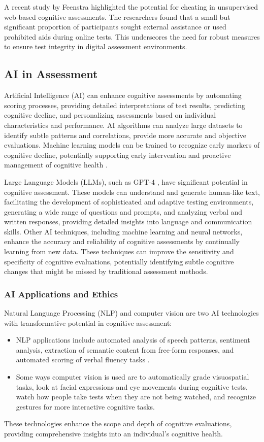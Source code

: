A recent study by Feenstra \cite{Feenstra2017} highlighted the potential for cheating in unsupervised web-based cognitive assessments. The researchers found that a small but significant proportion of participants sought external assistance or used prohibited aids during online tests. This underscores the need for robust measures to ensure test integrity in digital assessment environments.

\subsection{AI in Assessment}
Artificial Intelligence (AI) can enhance cognitive assessments by automating scoring processes, providing detailed interpretations of test results, predicting cognitive decline, and personalizing assessments based on individual characteristics and performance. AI algorithms can analyze large datasets to identify subtle patterns and correlations, provide more accurate and objective evaluations. Machine learning models can be trained to recognize early markers of cognitive decline, potentially supporting early intervention and proactive management of cognitive health \cite{Rabinowitz2019}.

Large Language Models (LLMs), such as GPT-4 \cite{Openai2023gpt4}, have significant potential in cognitive assessment. These models can understand and generate human-like text, facilitating the development of sophisticated and adaptive testing environments, generating a wide range of questions and prompts, and analyzing verbal and written responses, providing detailed insights into language and communication skills. Other AI techniques, including machine learning and neural networks, enhance the accuracy and reliability of cognitive assessments by continually learning from new data. These techniques can improve the sensitivity and specificity of cognitive evaluations, potentially identifying subtle cognitive changes that might be missed by traditional assessment methods.

\subsubsection{AI Applications and Ethics}
Natural Language Processing (NLP) and computer vision are two AI technologies with transformative potential in cognitive assessment:
\begin{itemize}
    \item NLP applications include automated analysis of speech patterns, sentiment analysis, extraction of semantic content from free-form responses, and automated scoring of verbal fluency tasks \cite{Weiner2016}.
    \item Some ways computer vision is used are to automatically grade visuospatial tasks, look at facial expressions and eye movements during cognitive tests, watch how people take tests when they are not being watched, and recognize gestures for more interactive cognitive tasks.
\end{itemize}
These technologies enhance the scope and depth of cognitive evaluations, providing comprehensive insights into an individual's cognitive health.

